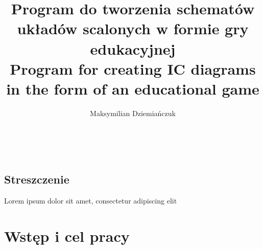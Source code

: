 \documentclass[12pt,a4paper,twoside]{report}
\title{\textbf{Program do tworzenia schematów układów scalonych w formie gry edukacyjnej}\\[2ex]
    \large Program for creating IC diagrams in the form of an educational game\\
}
\author{Maksymilian Dziemiańczuk}
\date{}
\begin{document}


\newpage \thispagestyle{empty} \ \newpage

\section*{Streszczenie}
\thispagestyle{plain}

Lorem ipsum dolor sit amet, consectetur adipiscing elit

\tableofcontents

\chapter{Wstęp i cel pracy}



    
    
\end{document}
